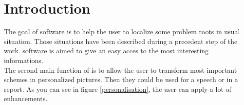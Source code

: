 
\tableofcontents
\chapter*{Introduction}

The goal of \tria software is to help the user to localize some problem roots in usual situation. Those situations have been described during a precedent step of the work. \tria software is aimed to give an easy acces to the most interesting informations.\\ 


The second main function of \tria is to allow the user to transform most important schemes in personalized pictures. Then they could be used for a speech or in a report. As you can see in figure \ref{personalisation}, the user can apply a lot of enhancements.\\

